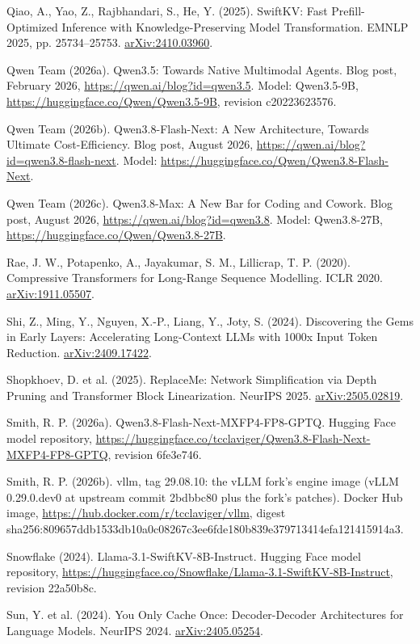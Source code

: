 \documentclass[11pt]{article}
\begin{document}
\begin{list}{}{\setlength{\leftmargin}{1.5em}\setlength{\itemindent}{-1.5em}\setlength{\itemsep}{1pt}\setlength{\parsep}{0pt}}
\item Qiao, A., Yao, Z., Rajbhandari, S., He, Y. (2025). SwiftKV: Fast Prefill-Optimized Inference with Knowledge-Preserving Model Transformation. EMNLP 2025, pp. 25734--25753. \href{https://arxiv.org/abs/2410.03960}{arXiv:2410.03960}.
\item Qwen Team (2026a). Qwen3.5: Towards Native Multimodal Agents. Blog post, February 2026, \url{https://qwen.ai/blog?id=qwen3.5}. Model: Qwen3.5-9B, \url{https://huggingface.co/Qwen/Qwen3.5-9B}, revision c20223623576.
\item Qwen Team (2026b). Qwen3.8-Flash-Next: A New Architecture, Towards Ultimate Cost-Efficiency. Blog post, August 2026, \url{https://qwen.ai/blog?id=qwen3.8-flash-next}. Model: \url{https://huggingface.co/Qwen/Qwen3.8-Flash-Next}.
\item Qwen Team (2026c). Qwen3.8-Max: A New Bar for Coding and Cowork. Blog post, August 2026, \url{https://qwen.ai/blog?id=qwen3.8}. Model: Qwen3.8-27B, \url{https://huggingface.co/Qwen/Qwen3.8-27B}.
\item Rae, J. W., Potapenko, A., Jayakumar, S. M., Lillicrap, T. P. (2020). Compressive Transformers for Long-Range Sequence Modelling. ICLR 2020. \href{https://arxiv.org/abs/1911.05507}{arXiv:1911.05507}.
\item Shi, Z., Ming, Y., Nguyen, X.-P., Liang, Y., Joty, S. (2024). Discovering the Gems in Early Layers: Accelerating Long-Context LLMs with 1000x Input Token Reduction. \href{https://arxiv.org/abs/2409.17422}{arXiv:2409.17422}.
\item Shopkhoev, D. et al. (2025). ReplaceMe: Network Simplification via Depth Pruning and Transformer Block Linearization. NeurIPS 2025. \href{https://arxiv.org/abs/2505.02819}{arXiv:2505.02819}.
\item Smith, R. P. (2026a). Qwen3.8-Flash-Next-MXFP4-FP8-GPTQ. Hugging Face model repository, \url{https://huggingface.co/tcclaviger/Qwen3.8-Flash-Next-MXFP4-FP8-GPTQ}, revision 6fe3e746.
\item Smith, R. P. (2026b). vllm, tag 29.08.10: the vLLM fork's engine image (vLLM 0.29.0.dev0 at upstream commit 2bdbbc80 plus the fork's patches). Docker Hub image, \url{https://hub.docker.com/r/tcclaviger/vllm}, digest sha256:809657ddb1533db10a0c08267c3ee6fde180b839e379713414efa121415914a3.
\item Snowflake (2024). Llama-3.1-SwiftKV-8B-Instruct. Hugging Face model repository, \url{https://huggingface.co/Snowflake/Llama-3.1-SwiftKV-8B-Instruct}, revision 22a50b8c.
\item Sun, Y. et al. (2024). You Only Cache Once: Decoder-Decoder Architectures for Language Models. NeurIPS 2024. \href{https://arxiv.org/abs/2405.05254}{arXiv:2405.05254}.

\end{list}
\end{document}
